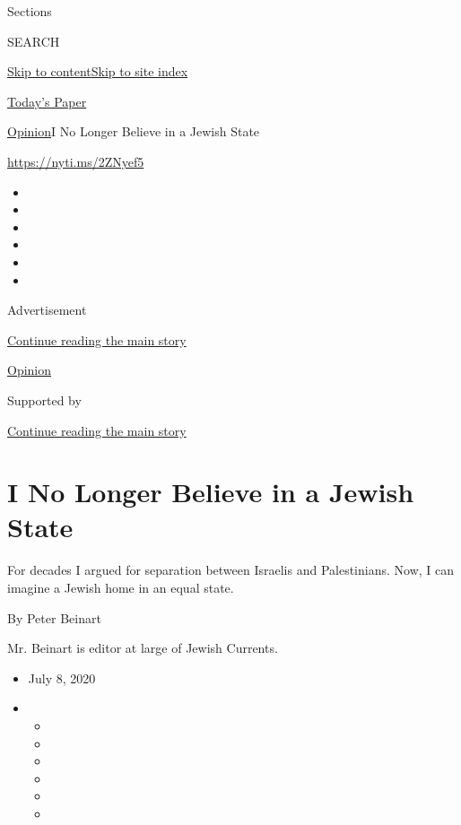 Sections

SEARCH

\protect\hyperlink{site-content}{Skip to
content}\protect\hyperlink{site-index}{Skip to site index}

\href{https://myaccount.nytimes3xbfgragh.onion/auth/login?response_type=cookie\&client_id=vi}{}

\href{https://www.nytimes3xbfgragh.onion/section/todayspaper}{Today's
Paper}

\href{/section/opinion}{Opinion}\textbar{}I No Longer Believe in a
Jewish State

\url{https://nyti.ms/2ZNyef5}

\begin{itemize}
\item
\item
\item
\item
\item
\item
\end{itemize}

Advertisement

\protect\hyperlink{after-top}{Continue reading the main story}

\href{/section/opinion}{Opinion}

Supported by

\protect\hyperlink{after-sponsor}{Continue reading the main story}

\hypertarget{i-no-longer-believe-in-a-jewish-state}{%
\section{I No Longer Believe in a Jewish
State}\label{i-no-longer-believe-in-a-jewish-state}}

For decades I argued for separation between Israelis and Palestinians.
Now, I can imagine a Jewish home in an equal state.

By Peter Beinart

Mr. Beinart is editor at large of Jewish Currents.

\begin{itemize}
\item
  July 8, 2020
\item
  \begin{itemize}
  \item
  \item
  \item
  \item
  \item
  \item
  \end{itemize}
\end{itemize}

